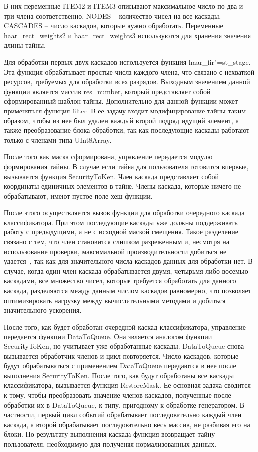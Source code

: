 В них переменные ITEM2 и ITEM3 описывают максимальное число по два и три члена соответственно, NODES – количество чисел на все каскады, CASCADES – число каскадов, которые нужно обработать. Переменные haar\_rect\_weights2 и haar\_rect\_weights3 используются для хранения значения длины тайны.

Для обработки первых двух каскадов используется функция haar\_fir"=st\_stage. Эта функция обрабатывает простые числа каждого члена, что связано с нехваткой ресурсов, требуемых для обработки всех разрядов. Выходным значением данной функции является массив res\_number, который представляет собой сформированный шаблон тайны. Дополнительно для данной функции может применяться функция filter. В ее задачу входит модифицирование тайны таким образом, чтобы из нее был удален каждый второй подряд идущий элемент, а также преобразование блока обработки, так как последующие каскады работают только с членами типа UInt8Array.

После того как маска сформирована, управление передается модулю формирования тайны. В случае если тайна для пользователя готовится впервые, вызывается функция SecurityToKen. Член каскада представляет собой координаты единичных элементов в тайне. Члены каскада, которые ничего не обрабатывают, имеют пустое поле хеш-функции.

После этого осуществляется вызов функции для обработки очередного каскада классификатора. При этом последующие каскады уже должны поддерживать работу с предыдущими, а не с исходной маской смещения.
Такое разделение связано с тем, что член становится слишком разреженным и, несмотря на использование проверки, максимальной производительности добиться не удается~\cite{comp_security}, так как для значительного числа каскадов данных для обработки нет.  В случае, когда один член каскада обрабатывается двумя, четырьмя либо восемью каскадами, все множество чисел, которые требуется обработать для данного каскада, разделяются между данным числом каскадов равномерно, что позволяет оптимизировать нагрузку между вычислительными методами и добиться значительного ускорения.

После того, как будет обработан очередной каскад классификатора, управление передается функции DataToQueue. Она является аналогом функции SecurityToKen, но учитывает уже обработанные каскады. DataToQueue снова вызывается обработчик членов и цикл повторяется. Число каскадов, которые будут обрабатываться с применением DataToQueue передаются в нее после выполнения SecurityToKen. После того, как будут обработаны все каскады классификатора, вызывается функция RestoreMask. Ее основная задача сводится к тому, чтобы преобразовать значение членов каскадов, полученные после обработки их в DataToQueue, к типу, пригодному к обработке генератором. В частности, первый цикл событий обрабатывает последовательно каждый член каскада, а второй обрабатывает последовательно весь массив, не разбивая его на блоки. По результату выполнения каскада функция возвращает тайну пользователя, необходимую для получения нормализованных данных.